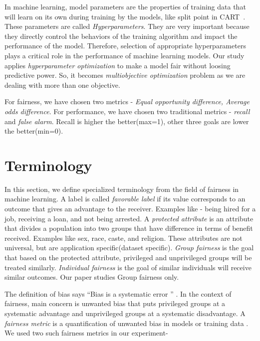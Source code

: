 \documentclass[10pt,conference]{IEEEtran}
\begin{document}
 In machine learning, model parameters are the properties of training data that will learn on its own during training by the models, like split point in CART~\cite{breiman2017classification}. These parameters are called \textit{Hyperparameters}. They are very important because they directly control the behaviors of the training algorithm and impact the performance of the model. Therefore, selection of appropriate hyperparameters plays a critical role in the performance of machine learning models. Our study applies \textit{hyperparameter optimization} to make a model fair without loosing predictive power. So, it becomes \textit{multiobjective optimization} problem as we are dealing with more than one objective. 
 
 For fairness, we have chosen two metrics - \textit{Equal opportunity difference, Average odds difference}. For performance, we have chosen two traditional metrics - \textit{recall} and \textit{false alarm}. Recall is higher the better(max=1), other three goals are lower the better(min=0).


\section{Terminology}

In this section, we define specialized terminology from the field of fairness in machine learning. A label is called \textit{favorable label} if its  value corresponds to an outcome that gives an advantage to the receiver. Examples like - being hired for a job, receiving a loan,  and not being arrested. A \textit{protected attribute} is an attribute that divides a population into two groups that have difference in terms of benefit received. Examples like sex, race, caste, and religion. These attributes are not universal, but are application specific(dataset specific). \textit{Group fairness} is the goal that based on the protected attribute, privileged and unprivileged groups will be treated similarly. \textit{Individual fairness} is the goal of similar individuals will receive similar outcomes.  Our paper studies Group fairness only. 

The definition of bias says ``Bias is a systematic error '' \cite{bias_systemetic}. In the context of fairness, main concern is unwanted bias that puts privileged groups at a systematic advantage and unprivileged groups at a systematic disadvantage. A \textit{fairness metric} is a quantification of unwanted bias in models or training data \cite{IBM}. We used two such fairness metrics in our experiment-
\end{document}
